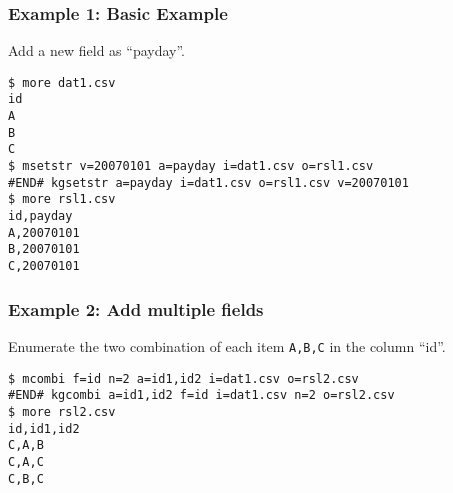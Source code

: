 \subsubsection*{Example 1: Basic Example}

Add a new field as “payday”.


\begin{Verbatim}[baselinestretch=0.7,frame=single]
$ more dat1.csv
id
A
B
C
$ msetstr v=20070101 a=payday i=dat1.csv o=rsl1.csv
#END# kgsetstr a=payday i=dat1.csv o=rsl1.csv v=20070101
$ more rsl1.csv
id,payday
A,20070101
B,20070101
C,20070101
\end{Verbatim}
\subsubsection*{Example 2: Add multiple fields}

Enumerate the two combination of each item \verb|A,B,C| in the column “id”.


\begin{Verbatim}[baselinestretch=0.7,frame=single]
$ mcombi f=id n=2 a=id1,id2 i=dat1.csv o=rsl2.csv
#END# kgcombi a=id1,id2 f=id i=dat1.csv n=2 o=rsl2.csv
$ more rsl2.csv
id,id1,id2
C,A,B
C,A,C
C,B,C
\end{Verbatim}
